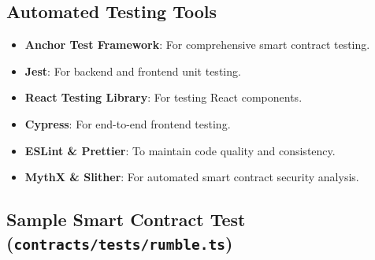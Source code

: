 \documentclass[11pt,a4paper]{article}
\begin{document}
\subsection{Automated Testing Tools}

\begin{itemize}
    \item \textbf{Anchor Test Framework}: For comprehensive smart contract testing.
    \item \textbf{Jest}: For backend and frontend unit testing.
    \item \textbf{React Testing Library}: For testing React components.
    \item \textbf{Cypress}: For end-to-end frontend testing.
    \item \textbf{ESLint \& Prettier}: To maintain code quality and consistency.
    \item \textbf{MythX \& Slither}: For automated smart contract security analysis.
\end{itemize}

\subsection{Sample Smart Contract Test (\texttt{contracts/tests/rumble.ts})}
\end{document}
